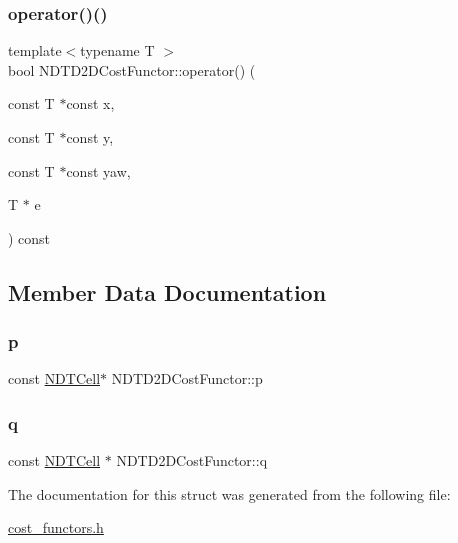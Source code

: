 \subsubsection{\texorpdfstring{operator()()}{operator()()}}
{\footnotesize\ttfamily template$<$typename T $>$ \\
bool N\+D\+T\+D2\+D\+Cost\+Functor\+::operator() (\begin{DoxyParamCaption}\item[{const T $\ast$const}]{x,  }\item[{const T $\ast$const}]{y,  }\item[{const T $\ast$const}]{yaw,  }\item[{T $\ast$}]{e }\end{DoxyParamCaption}) const\hspace{0.3cm}{\ttfamily [inline]}}



\subsection{Member Data Documentation}
\mbox{\label{structNDTD2DCostFunctor_accbe8aa1cdccfc8e62fd4a95abbef164}} 
\subsubsection{\texorpdfstring{p}{p}}
{\footnotesize\ttfamily const \hyperlink{classNDTCell}{N\+D\+T\+Cell}$\ast$ N\+D\+T\+D2\+D\+Cost\+Functor\+::p}

\mbox{\label{structNDTD2DCostFunctor_a936751da6f0d2880109dcfa4060ac341}} 
\subsubsection{\texorpdfstring{q}{q}}
{\footnotesize\ttfamily const \hyperlink{classNDTCell}{N\+D\+T\+Cell} $\ast$ N\+D\+T\+D2\+D\+Cost\+Functor\+::q}



The documentation for this struct was generated from the following file\+:\begin{DoxyCompactItemize}
\item 
\hyperlink{cost__functors_8h}{cost\+\_\+functors.\+h}\end{DoxyCompactItemize}
